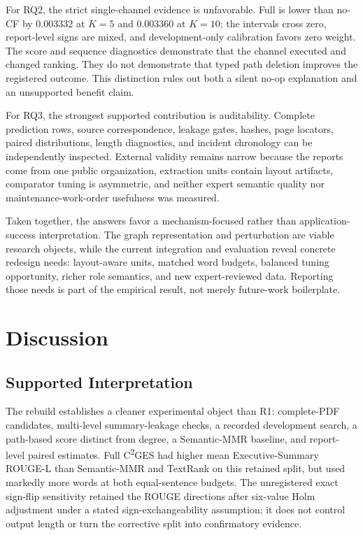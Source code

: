 \documentclass[applsci,article,submit,moreauthors]{Definitions/mdpi}
\newcommand{\cges}{C\textsuperscript{2}GES}
\begin{document}
For RQ2, the strict single-channel evidence is unfavorable. Full is lower than no-CF by 0.003332 at $K=5$ and 0.003360 at $K=10$; the intervals cross zero, report-level signs are mixed, and development-only calibration favors zero weight. The score and sequence diagnostics demonstrate that the channel executed and changed ranking. They do not demonstrate that typed path deletion improves the registered outcome. This distinction rules out both a silent no-op explanation and an unsupported benefit claim.

For RQ3, the strongest supported contribution is auditability. Complete prediction rows, source correspondence, leakage gates, hashes, page locators, paired distributions, length diagnostics, and incident chronology can be independently inspected. External validity remains narrow because the reports come from one public organization, extraction units contain layout artifacts, comparator tuning is asymmetric, and neither expert semantic quality nor maintenance-work-order usefulness was measured.

Taken together, the answers favor a mechanism-focused rather than application-success interpretation. The graph representation and perturbation are viable research objects, while the current integration and evaluation reveal concrete redesign needs: layout-aware units, matched word budgets, balanced tuning opportunity, richer role semantics, and new expert-reviewed data. Reporting those needs is part of the empirical result, not merely future-work boilerplate.

\section{Discussion}

\subsection{Supported Interpretation}

The rebuild establishes a cleaner experimental object than R1: complete-PDF candidates, multi-level summary-leakage checks, a recorded development search, a path-based score distinct from degree, a Semantic-MMR baseline, and report-level paired estimates. Full \cges{} had higher mean Executive-Summary ROUGE-L than Semantic-MMR and TextRank on this retained split, but used markedly more words at both equal-sentence budgets. The unregistered exact sign-flip sensitivity retained the ROUGE directions after six-value Holm adjustment under a stated sign-exchangeability assumption; it does not control output length or turn the corrective split into confirmatory evidence.
\end{document}
